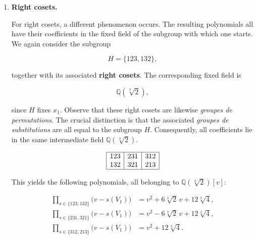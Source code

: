 \documentclass[a4paper,11pt]{article}
\begin{document}
\begin{enumerate}
	\[
	\mathbb{Q}(\alpha),\qquad
	\mathbb{Q}(\omega\alpha),\qquad
	\mathbb{Q}(\omega^2\alpha).
	\]
	
	The essential point is that the corresponding \textit{groupes de substitutions} are
	
	\[
	\{123,132\},\qquad
	\{123,321\},\qquad
	\{123,213\}.
	\]
	
	These three groups are conjugate to one another and therefore correspond to the three conjugate fields. This is precisely the phenomenon described by Galois in Proposition~II: the minimal polynomial of \(V_1\) over \(\mathbb{Q}\) factors into polynomials whose coefficients belong to mutually conjugate intermediate fields.
	
	\item \textbf{Right cosets.}
	
	For right cosets, a different phenomenon occurs. The resulting polynomials all have their coefficients in the fixed field of the subgroup with which one starts. We again consider the subgroup
	
	\[
	H=\{123,132\},
	\]
	
	together with its associated \textbf{right cosets}. The corresponding fixed field is
	
	\[
	\mathbb{Q}(\sqrt[3]{2}),
	\]
	
	since \(H\) fixes \(x_1\). Observe that these right cosets are likewise \textit{groupes de permutations}. The crucial distinction is that the associated \textit{groupes de substitutions} are all equal to the subgroup \(H\). Consequently, all coefficients lie in the same intermediate field \(\mathbb{Q}(\sqrt[3]{2})\).
	
	\begin{equation}
		\label{eq:tabel2222}
		\begin{array}{|c|c|c|}
			\hline
			123 & 231 & 312\\
			132 & 321 & 213\\
			\hline
		\end{array}
	\end{equation}
	
	This yields the following polynomials, all belonging to
	\(\mathbb{Q}(\sqrt[3]{2})[v]\):
	
	\[
	\begin{aligned}
		\prod_{s\in\{123,132\}}\bigl(v-s(V_1)\bigr)
		&=
		v^2+6\sqrt[3]{2}\,v+12\sqrt[3]{4},\\[1ex]
		\prod_{s\in\{231,321\}}\bigl(v-s(V_1)\bigr)
		&=
		v^2-6\sqrt[3]{2}\,v+12\sqrt[3]{4},\\[1ex]
		\prod_{s\in\{312,213\}}\bigl(v-s(V_1)\bigr)
		&=
		v^2+12\sqrt[3]{4}.
	\end{aligned}
	\]
	

\end{enumerate}
\end{document}
